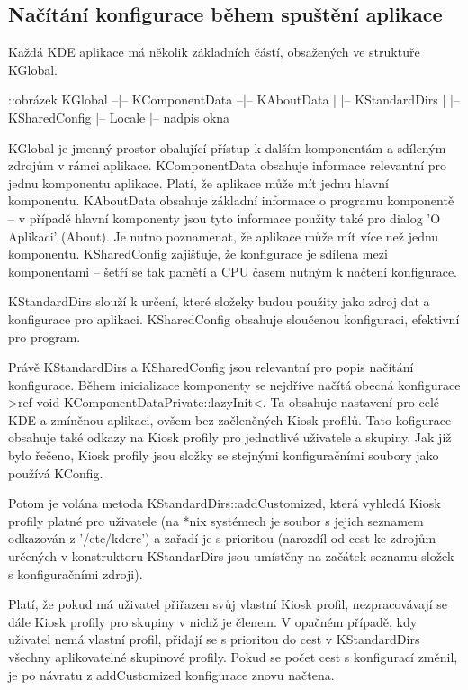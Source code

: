 \subsection{Načítání konfigurace během spuštění aplikace}
Každá KDE aplikace má několik základních částí, obsažených ve struktuře KGlobal.

            ::obrázek
            KGlobal --|-- KComponentData --|-- KAboutData
                      |                    |-- KStandardDirs
                      |                    |-- KSharedConfig
                      |-- Locale
                      |-- nadpis okna

KGlobal je jmenný prostor obalující přístup k dalším komponentám a sdíleným
zdrojům v rámci aplikace.
KComponentData obsahuje informace relevantní pro jednu komponentu aplikace.
Platí, že aplikace může mít jednu hlavní komponentu.
KAboutData obsahuje základní informace o programu komponentě -- v případě hlavní
komponenty jsou tyto informace použity také pro dialog 'O Aplikaci' (About).
Je nutno poznamenat, že aplikace může mít více než jednu komponentu.
KSharedConfig zajišťuje, že konfigurace je sdílena mezi komponentami -- šetří
se tak pamětí a CPU časem nutným k načtení konfigurace.

KStandardDirs slouží k určení, které složeky budou použity jako zdroj dat
a konfigurace pro aplikaci.
KSharedConfig obsahuje sloučenou konfiguraci, efektivní pro program.

Právě KStandardDirs a KSharedConfig jsou relevantní pro popis načítání
konfigurace. Během inicializace komponenty se nejdříve načítá obecná konfigurace
>ref void KComponentDataPrivate::lazyInit<. Ta obsahuje nastavení pro celé KDE
a zmíněnou aplikaci, ovšem bez začleněných Kiosk profilů. Tato kofigurace
obsahuje také odkazy na Kiosk profily pro jednotlivé uživatele a skupiny. Jak
již bylo řečeno, Kiosk profily jsou složky se stejnými konfiguračními soubory
jako používá KConfig.

Potom je volána metoda KStandardDirs::addCustomized, která vyhledá Kiosk profily
platné pro uživatele (na *nix systémech je soubor s jejich seznamem odkazován z
'/etc/kderc') a zařadí je s prioritou (narozdíl od cest ke zdrojům určených
v konstruktoru KStandarDirs jsou umístěny na začátek seznamu složek
s konfiguračními zdroji).

Platí, že pokud má uživatel přiřazen svůj vlastní Kiosk profil, nezpracovávají
se dále Kiosk profily pro skupiny v nichž je členem. V opačném případě, kdy
uživatel nemá vlastní profil, přidají se s prioritou do cest v KStandardDirs
všechny aplikovatelné skupinové profily. Pokud se počet cest s konfigurací
změnil, je po návratu z addCustomized konfigurace znovu načtena.

